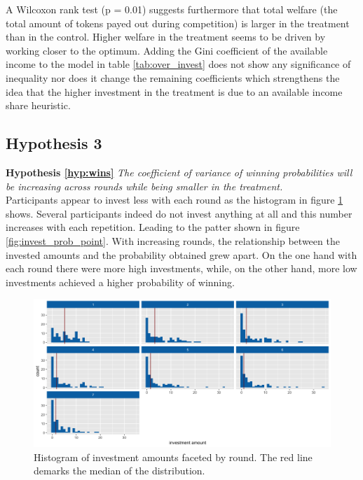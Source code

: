 A Wilcoxon rank test (p = 0.01) suggests furthermore that total welfare (the total amount of tokens payed out during competition) is larger in the treatment than in the control. Higher welfare in the treatment seems to be driven by working closer to the optimum. Adding the Gini coefficient of the available income to the model in table \ref{tab:over_invest} does not show any significance of inequality nor does it change the remaining coefficients which strengthens the idea that the higher investment in the treatment is due to an available income share heuristic.\\

\subsection{Hypothesis 3}

\textbf{Hypothesis \ref{hyp:wins}} \textit{The coefficient of variance of winning probabilities will be increasing across rounds while being smaller in the treatment.}\\

Participants appear to invest less with each round as the histogram in figure \ref{fig:invest_hist} shows. Several participants indeed do not invest anything at all and this number increases with each repetition. Leading to the patter shown in figure \ref{fig:invest_prob_point}. With increasing rounds, the relationship between the invested amounts and the probability obtained grew apart. On the one hand with each round there were more high investments, while, on the other hand, more low investments achieved a higher probability of winning.\\

\begin{figure}
    \centering
    \includegraphics[width=\textwidth]{graphs/investment_amount_hist.png}
    \caption{Histogram of investment amounts faceted by round. The red line demarks the median of the distribution.}
    \label{fig:invest_hist}
\end{figure}

